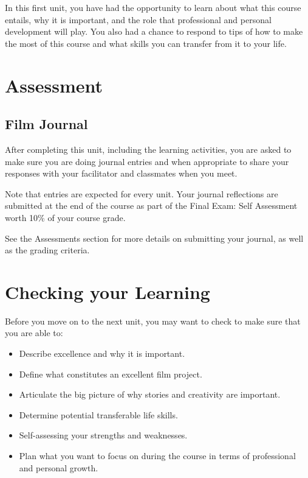 \documentclass[
]{book}
\providecommand{\tightlist}{%
  \setlength{\itemsep}{0pt}\setlength{\parskip}{0pt}}
\begin{document}
In this first unit, you have had the opportunity to learn about what this course entails, why it is important, and the role that professional and personal development will play. You also had a chance to respond to tips of how to make the most of this course and what skills you can transfer from it to your life.

\hypertarget{assessment-1}{%
\section*{Assessment}\label{assessment-1}}

\begin{assessment}
\hypertarget{film-journal}{%
\subsection*{Film Journal}\label{film-journal}}

After completing this unit, including the learning activities, you are asked to make sure you are doing journal entries and when appropriate to share your responses with your facilitator and classmates when you meet.

Note that entries are expected for every unit. Your journal reflections are submitted at the end of the course as part of the Final Exam: Self Assessment worth 10\% of your course grade.

See the Assessments section for more details on submitting your journal, as well as the grading criteria.
\end{assessment}

\hypertarget{checking-your-learning}{%
\section*{Checking your Learning}\label{checking-your-learning}}

\begin{progress}
Before you move on to the next unit, you may want to check to make sure that you are able to:

\begin{itemize}
\tightlist
\item
  Describe excellence and why it is important.\\
\item
  Define what constitutes an excellent film project.\\
\item
  Articulate the big picture of why stories and creativity are important.\\
\item
  Determine potential transferable life skills.\\
\item
  Self-assessing your strengths and weaknesses.\\
\item
  Plan what you want to focus on during the course in terms of professional and personal growth.
\end{itemize}
\end{progress}
\end{document}
